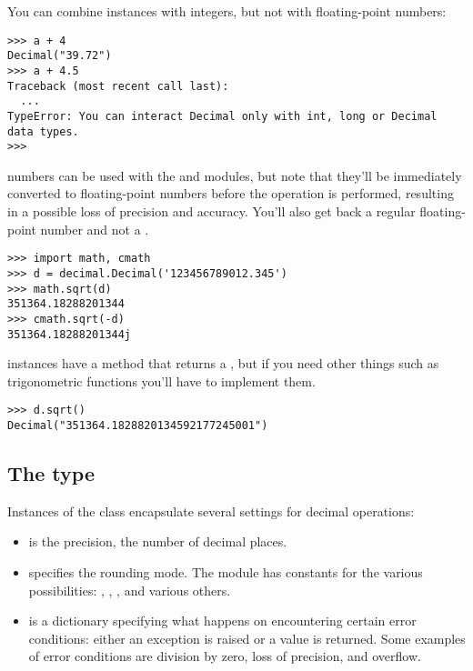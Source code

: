 \documentclass{howto}
\begin{document}
You can combine  instances with integers, but not with
floating-point numbers:

\begin{verbatim}
>>> a + 4
Decimal("39.72")
>>> a + 4.5
Traceback (most recent call last):
  ...
TypeError: You can interact Decimal only with int, long or Decimal data types.
>>>
\end{verbatim}

 numbers can be used with the  and
 modules, but note that they'll be immediately converted to 
floating-point numbers before the operation is performed, resulting in
a possible loss of precision and accuracy.  You'll also get back a
regular floating-point number and not a .  

\begin{verbatim}
>>> import math, cmath
>>> d = decimal.Decimal('123456789012.345')
>>> math.sqrt(d)
351364.18288201344
>>> cmath.sqrt(-d)
351364.18288201344j
\end{verbatim}

 instances have a  method that
returns a , but if you need other things such as
trigonometric functions you'll have to implement them.

\begin{verbatim}
>>> d.sqrt()
Decimal("351364.1828820134592177245001")
\end{verbatim}


\subsection{The  type}

Instances of the  class encapsulate several settings for 
decimal operations:

\begin{itemize}
 \item {} is the precision, the number of decimal places.
 \item {} specifies the rounding mode.  The 
       module has constants for the various possibilities:
       , , 
       , and various others.
 \item {} is a dictionary specifying what happens on
encountering certain error conditions: either  an exception is raised or 
a value is returned.  Some examples of error conditions are
division by zero, loss of precision, and overflow.
\end{itemize}
\end{document}
